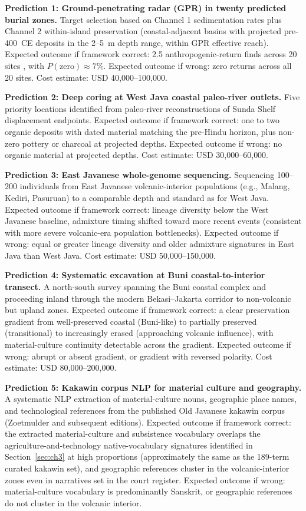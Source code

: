 \documentclass[12pt,a4paper]{article}
\begin{document}
\textbf{Prediction 1: Ground-penetrating radar (GPR) in twenty predicted burial zones.} Target selection based on Channel 1 sedimentation rates plus Channel 2 within-island preservation (coastal-adjacent basins with projected pre-400~CE deposits in the 2--5~m depth range, within GPR effective reach). Expected outcome if framework correct: 2.5 anthropogenic-return finds across 20 sites \citep[0--6 range,][]{amien_e116}, with $P(\mathrm{zero}) \approx 7\%$. Expected outcome if wrong: zero returns across all 20 sites. Cost estimate: USD 40{,}000--100{,}000.

\textbf{Prediction 2: Deep coring at West Java coastal paleo-river outlets.} Five priority locations identified from paleo-river reconstructions \citep[E177]{amien_e177} of Sunda Shelf displacement endpoints. Expected outcome if framework correct: one to two organic deposits with dated material matching the pre-Hindu horizon, plus non-zero pottery or charcoal at projected depths. Expected outcome if wrong: no organic material at projected depths. Cost estimate: USD 30{,}000--60{,}000.

\textbf{Prediction 3: East Javanese whole-genome sequencing.} Sequencing 100--200 individuals from East Javanese volcanic-interior populations (e.g., Malang, Kediri, Pasuruan) to a comparable depth and standard as \citet{maulana2024} for West Java. Expected outcome if framework correct: lineage diversity below the West Javanese baseline, admixture timing shifted toward more recent events (consistent with more severe volcanic-era population bottlenecks). Expected outcome if wrong: equal or greater lineage diversity and older admixture signatures in East Java than West Java. Cost estimate: USD 50{,}000--150{,}000.

\textbf{Prediction 4: Systematic excavation at Buni coastal-to-interior transect.} A north-south survey spanning the Buni coastal complex and proceeding inland through the modern Bekasi--Jakarta corridor to non-volcanic but upland zones. Expected outcome if framework correct: a clear preservation gradient from well-preserved coastal (Buni-like) to partially preserved (transitional) to increasingly erased (approaching volcanic influence), with material-culture continuity detectable across the gradient. Expected outcome if wrong: abrupt or absent gradient, or gradient with reversed polarity. Cost estimate: USD 80{,}000--200{,}000.

\textbf{Prediction 5: Kakawin corpus NLP for material culture and geography.} A systematic NLP extraction of material-culture nouns, geographic place names, and technological references from the published Old Javanese kakawin corpus (Zoetmulder and subsequent editions). Expected outcome if framework correct: the extracted material-culture and subsistence vocabulary overlaps the agriculture-and-technology native-vocabulary signatures identified in Section~\ref{sec:ch3} at high proportions (approximately the same as the 189-term curated kakawin set), and geographic references cluster in the volcanic-interior zones even in narratives set in the court register. Expected outcome if wrong: material-culture vocabulary is predominantly Sanskrit, or geographic references do not cluster in the volcanic interior.
\end{document}

